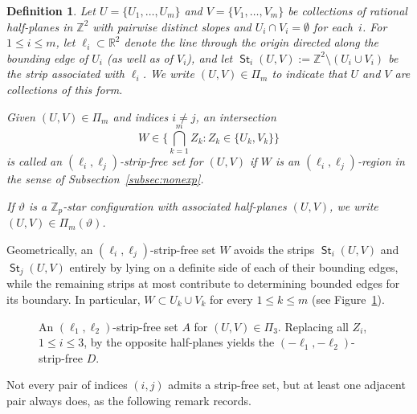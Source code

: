 \documentclass[12pt]{amsart}
\numberwithin{equation}{section}
\newtheorem{definition}[theorem]{Definition}
\DeclareMathOperator{\st}{\mathsf{St}}
\newcommand{\bb}[1]{\mathbb{#1}}
\begin{document}
\begin{definition}\label{def:stripfree}
Let $U = \{U_1, \ldots, U_m\} $ and $V = \{V_1, \ldots, V_m\}$ be collections of rational half-planes in $\bb{Z}^2$ with pairwise distinct slopes and $U_i \cap V_i = \emptyset$ for each~$i$. For $ 1 \le i \le m $, let $\ell_i \subset \bb{R}^2$ denote the line through the origin directed along the bounding edge of $U_i$ (as well as of $V_i$), and let $\st_i(U,V) := \bb{Z}^2 \setminus (U_i \cup V_i)$ be the strip associated with $\ell_i$. We write $(U,V) \in \Pi_m$ to indicate that $ U $ and $ V $ are collections of this form.

Given $(U,V) \in \Pi_m$ and indices $ i \neq j $, an intersection
$$W \in \Big\{ \bigcap_{k = 1}^m Z_k : Z_k \in \{U_k,V_k\}\Big\}$$ 
is called an \emph{$(\pmb{\ell}_i,\pmb{\ell}_j)$-strip-free set} for $(U,V)$ if $W$ is an $(\pmb{\ell}_i,\pmb{\ell}_j)$-region 
in the sense of Subsection~\ref{subsec:nonexp}.

If $\vartheta$ is a $\mathbb Z_p$-star configuration with associated half-planes $(U,V)$, we write $(U,V) \in \Pi_m(\vartheta)$.
\end{definition}

Geometrically, an $(\pmb{\ell}_i,\pmb{\ell}_j)$-strip-free set $ W $ avoids the strips $\st_i(U,V)$ and $\st_j(U,V)$ entirely by lying on a definite side of each of their bounding edges, while the remaining strips at most contribute to determining bounded edges for its boundary. In particular, $W \subset U_k \cup V_k$ for every $1 \leq k \leq m$ (see Figure~\ref{fig3}). 
 
\begin{figure}[ht]
	\centering\def\svgwidth{12.8cm}
	\caption{An $(\pmb{\ell}_1,\pmb{\ell}_2)$-strip-free set $ A $ for $(U,V) \in \Pi_3$. 
    Replacing all $Z_i$, $ 1 \le i \le 3 $, by the opposite half-planes yields the $(-\pmb{\ell}_1,-\pmb{\ell}_2)$-strip-free $D$.}
	\label{fig3}
\end{figure}

Not every pair of indices $(i,j)$ admits a strip-free set, but at least one adjacent pair always does, as the following remark records. 
\end{document}
